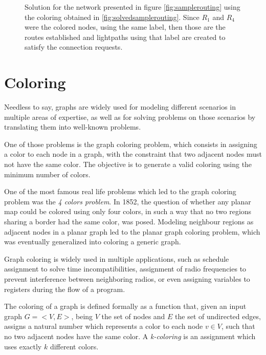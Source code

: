{\begin{figure}[h]
		
		\caption{Solution for the network presented in figure \ref{fig:samplerouting} using the coloring obtained in \ref{fig:solvedsamplerouting}. Since $R_1$ and $R_4$ were the colored nodes, using the same label, then those are the routes established and lightpaths using that label are created to satisfy the connection requests.}
		\label{fig:solvedsampleroutingnetwork}
	\end{figure}
}


\section{Coloring}

Needless to say, graphs are widely used for modeling different scenarios in multiple areas of expertise, as well as for solving problems on those scenarios by translating them into well-known problems. 

One of those problems is the graph coloring problem, which consists in assigning a color to each node in a graph, with the constraint that two adjacent nodes must not have the same color. The objective is to generate a valid coloring using the minimum number of colors.

One of the most famous real life problems which led to the graph coloring problem was the \textit{4 colors problem}. In 1852, the question of whether any planar map could be colored using only four colors, in such a way that no two regions sharing a border had the same color, was posed. Modeling neighbour regions as adjacent nodes in a planar graph led to the planar graph coloring problem, which was eventually generalized into coloring a generic graph.

Graph coloring is widely used in multiple applications, such as schedule assignment to solve time incompatibilities, assignment of radio frequencies to prevent interference between neighboring radios, or even assigning variables to registers during the flow of a program.

The coloring of a graph is defined formally as a function that, given an input graph $G = <V,E>$, being $V$ the set of nodes and $E$ the set of undirected edges, assigns a natural number which represents a color to each node $v \in V$, such that no two adjacent nodes have the same color. A \textit{k-coloring} is an assignment which uses exactly $k$ different colors.

